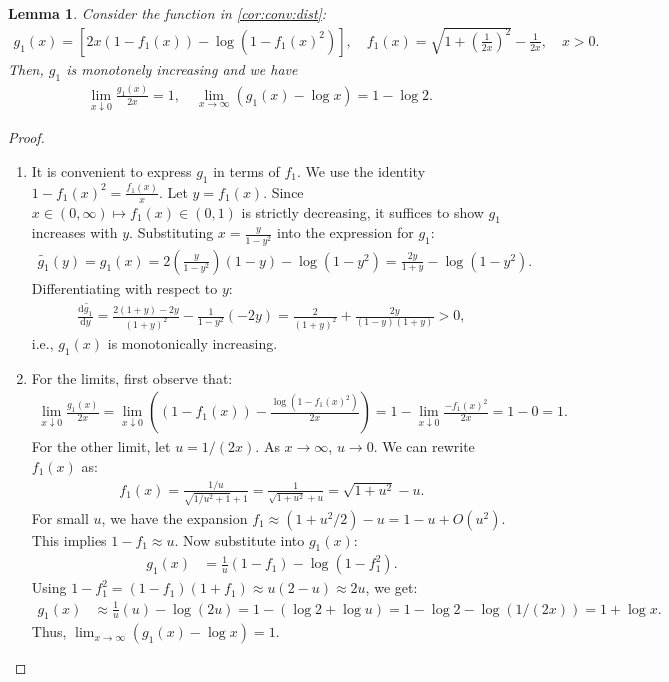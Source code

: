 \documentclass[noinfoline]{imsart}\setcounter{tocdepth}{2}
\newcommand{\rd}{\mathrm{d}}
\theoremstyle{plain}
\newtheorem{lemma}[theorem]{Lemma}
\begin{document}
\begin{appendix}
\begin{lemma}\label{lem:conv:ftn:mono}
Consider the function in \cref{cor:conv:dist}:
\begin{align*}
    g_{1}(x) = \left[ 2 x (1-f_{1}(x)) - \log (1- f_{1}(x)^{2}) \right], \quad f_{1}(x) = \sqrt{1 + \left(\frac{1}{2x}\right)^2} - \frac{1}{2x}, \quad x > 0.
\end{align*}
Then, $g_{1}$ is monotonely increasing and we have
\begin{align*}
    \lim_{x \downarrow 0} \frac{g_{1}(x)}{2x} = 1, \quad \lim_{x \to \infty} (g_{1}(x) - \log x) = 1 - \log 2.
\end{align*}
\end{lemma}
\begin{proof}
\begin{enumerate}[leftmargin = *]
\item It is convenient to express $g_1$ in terms of $f_1$. We use the identity $1 - f_{1}(x)^2 = \frac{f_1(x)}{x}$. 
Let $y = f_1(x)$. Since $x \in (0, \infty)\mapsto f_1(x) \in (0, 1)$ is strictly decreasing, it suffices to show $g_1$ increases with $y$. Substituting $x = \frac{y}{1-y^2}$ into the expression for $g_1$:
\begin{align*}
    \tilde{g_1}(y) = g_{1}(x) = 2 \left( \frac{y}{1-y^2} \right) (1-y) - \log(1-y^2) = \frac{2y}{1+y} - \log(1-y^2).
\end{align*}
Differentiating with respect to $y$:
\begin{align*}
    \frac{\rd \tilde{g_1}}{\rd y} = \frac{2(1+y) - 2y}{(1+y)^2} - \frac{1}{1-y^2}(-2y) = \frac{2}{(1+y)^2} + \frac{2y}{(1-y)(1+y)} > 0,
\end{align*}
i.e., $g_1(x)$ is monotonically increasing.

\item For the limits, first observe that:
\begin{align*}
    \lim_{x \downarrow 0} \frac{g_1(x)}{2x} = \lim_{x \downarrow 0} \left( (1-f_1(x)) - \frac{\log(1-f_1(x)^2)}{2x} \right) = 1 - \lim_{x \downarrow 0} \frac{-f_1(x)^2}{2x} = 1 - 0 = 1.
\end{align*}
For the other limit, let $u = 1/(2x)$. As $x \to \infty$, $u \to 0$. We can rewrite $f_1(x)$ as:
\begin{align*}
    f_{1}(x) = \frac{1/u}{\sqrt{1/u^2+1}+1} = \frac{1}{\sqrt{1+u^2}+u} = \sqrt{1+u^2}-u.
\end{align*}
For small $u$, we have the expansion $f_1 \approx (1 + u^2/2) - u = 1 - u + O(u^2)$.
This implies $1 - f_1 \approx u$.
Now substitute into $g_1(x)$:
\begin{align*}
    g_{1}(x) &= \frac{1}{u}(1-f_1) - \log(1-f_1^2).
\end{align*}
Using $1-f_1^2 = (1-f_1)(1+f_1) \approx u(2-u) \approx 2u$, we get:
\begin{align*}
    g_{1}(x) &\approx \frac{1}{u}(u) - \log(2u) = 1 - (\log 2 + \log u) = 1 - \log 2 - \log(1/(2x)) = 1 + \log x.
\end{align*}
Thus, $\lim_{x \to \infty} (g_1(x) - \log x) = 1$.
\end{enumerate}
\end{proof}


\end{appendix}
\end{document}
